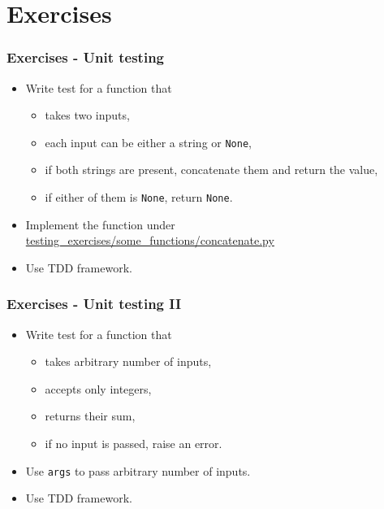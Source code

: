 \documentclass[9pt,xcolor=dvipsnames]{beamer}
\begin{document}
\section{Exercises}
\begin{frame}
  \frametitle{Exercises - Unit testing}
  \begin{itemize}
  \item Write test for a function that
    \begin{itemize}
    \item takes two inputs,
    \item each input can be either a string or {\tt None},
    \item if both strings are present, concatenate them and return
      the value,
    \item if either of them is {\tt None}, return {\tt None}. 
    \end{itemize}
  \item Implement the function under
    \url{testing_exercises/some_functions/concatenate.py}
  \item Use TDD framework.
  \end{itemize}
\end{frame}

\begin{frame}
  \frametitle{Exercises - Unit testing II}
  \begin{itemize}
  \item Write test for a function that
    \begin{itemize}
    \item takes arbitrary number of inputs,
    \item accepts only integers,
    \item returns their sum,
    \item if no input is passed, raise an error.
    \end{itemize}
  \item Use {\tt *args} to pass arbitrary number of inputs.
    \item Use TDD framework.
  \end{itemize}
\end{frame}
\end{document}
